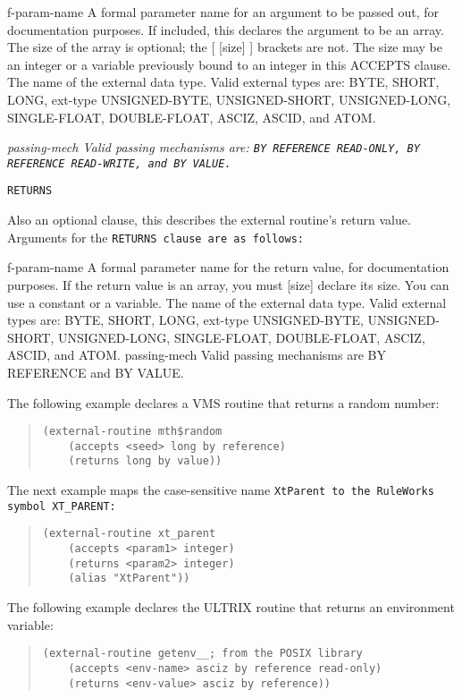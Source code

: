 f-param-name A formal parameter name for an argument to be
passed out, for documentation purposes.
If included, this declares the argument to be an
array. The size of the array is optional; the
[ [size] ]   brackets are not. The size may be an integer or
a variable previously bound to an integer in
this ACCEPTS clause.
The name of the external data type. Valid
external types are: BYTE, SHORT, LONG,
ext-type     UNSIGNED-BYTE, UNSIGNED-SHORT, UNSIGNED-LONG,
SINGLE-FLOAT, DOUBLE-FLOAT, ASCIZ, ASCID, and
ATOM.

\it{passing-mech} Valid passing mechanisms are: \tt{BY REFERENCE
  READ-ONLY}, \tt{BY REFERENCE READ-WRITE}, and \tt{BY VALUE}.

\tt{RETURNS}

Also an optional clause, this describes the external routine's return
value. Arguments for the \tt{RETURNS} clause are as follows:

f-param-name A formal parameter name for the return value,
for documentation purposes.
If the return value is an array, you must
[size]       declare its size. You can use a constant or a
variable.
The name of the external data type. Valid
external types are: BYTE, SHORT, LONG,
ext-type     UNSIGNED-BYTE, UNSIGNED-SHORT, UNSIGNED-LONG,
SINGLE-FLOAT, DOUBLE-FLOAT, ASCIZ, ASCID, and
ATOM.
passing-mech Valid passing mechanisms are BY REFERENCE and BY
VALUE.

\Example

The following example declares a VMS routine that returns a
random number:
\begin{quote}
\begin{verbatim}
(external-routine mth$random
    (accepts <seed> long by reference)
    (returns long by value))
\end{verbatim}
\end{quote}

The next example maps the case-sensitive name \tt{XtParent} to the
RuleWorks symbol \verb|XT_PARENT|:

\begin{quote}
\begin{verbatim}
(external-routine xt_parent
    (accepts <param1> integer)
    (returns <param2> integer)
    (alias "XtParent"))
\end{verbatim}
\end{quote} 

The following example declares the ULTRIX routine that
returns an environment variable:

\begin{quote}
\begin{verbatim}
(external-routine getenv__; from the POSIX library
    (accepts <env-name> asciz by reference read-only)
    (returns <env-value> asciz by reference))
\end{verbatim}
\end{quote}

